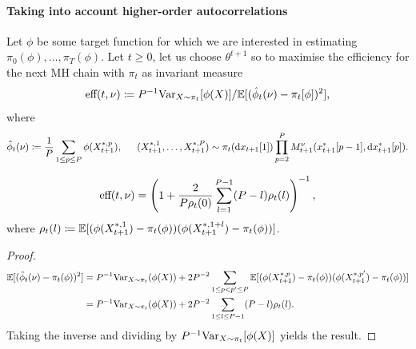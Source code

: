 \paragraph{Taking into account higher-order autocorrelations}
Let $\phi$ be some target function for which we are interested in estimating $\pi_0(\phi), \ldots, \pi_T(\phi)$.
Let $t\geq 0$, let us choose $\theta^{t+1}$ so to maximise the efficiency for the next MH chain with $\pi_t$ as invariant measure
\begin{equation}
    \textup{eff}(t, \nu)\coloneq P^{-1}\textup{Var}_{X\sim \pi_{t}}[\phi(X)] / \mathbb{E}[(\hat{\phi}_t(\nu)-\pi_t[\phi])^2],
\end{equation}
where
\begin{equation}
    \hat{\phi}_t(\nu)\coloneq \frac{1}{P}\sum_{1\leq p\leq P} \phi(X_{t+1}^{*,p}),\indent (X_{t+1}^{*,1},\ldots, X_{t+1}^{*,P})\sim \pi_t(\dd x_{t+1}[1])\prod_{p=2}^{P}M_{t+1}^{\nu}(x_{t+1}^{*}[p-1], \dd x_{t+1}^{*}[p]).
\end{equation}
\begin{proposition}
    \begin{equation}
        \begin{split}
            \textup{eff}(t,\nu) = \left(1 + \frac{2}{P \rho_{t}(0)}\sum_{l=1}^{P-1}(P-l)\rho_{t}(l)\right)^{-1},
        \end{split}
    \end{equation}
    where $\rho_{t}(l)\coloneq \mathbb{E}[(\phi(X^{*,1}_{t+1})-\pi_t(\phi))(\phi(X^{*,1+l}_{t+1})-\pi_t(\phi))]$.
    \begin{proof}
        \begin{equation}
            \begin{split}
                \mathbb{E}[(\hat{\phi}_t(\nu)-\pi_t(\phi))^2] &= P^{-1}\textup{Var}_{X\sim \pi_t}(\phi(X)) + 2P^{-2} \sum_{1\leq p< p'\leq P}\mathbb{E}[(\phi(X_{t+1}^{*,p})-\pi_t(\phi))(\phi(X_{t+1}^{*,p'})-\pi_t(\phi))]\\
                &= P^{-1}\textup{Var}_{X\sim \pi_t}(\phi(X)) + 2P^{-2}\sum_{1\leq l\leq P-1}(P-l)\rho_t(l).
            \end{split}
        \end{equation}
        Taking the inverse and dividing by $P^{-1}\textup{Var}_{X\sim \pi_t}[\phi(X)]$ yields the result.
    \end{proof}
\end{proposition}
